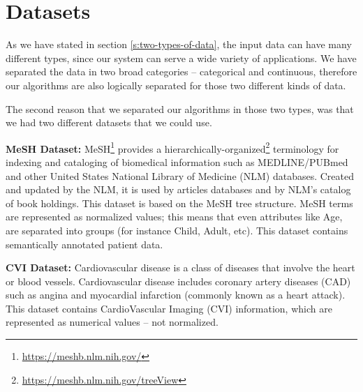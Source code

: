 \section{Datasets}\label{s:datasets}
As we have stated in section \ref{s:two-types-of-data}, the input data can have many different types, since our system can serve a wide variety of applications.
We have separated the data in two broad categories -- categorical and continuous, therefore our algorithms are also logically separated for those two different kinds of data.

The second reason that we separated our algorithms in those two types, was that we had two different datasets that we could use.

\textbf{MeSH Dataset:}
MeSH\footnote{\href{https://meshb.nlm.nih.gov/}{https://meshb.nlm.nih.gov/}} provides a hierarchically-organized\footnote{\href{https://meshb.nlm.nih.gov/treeView}{https://meshb.nlm.nih.gov/treeView}} terminology for indexing and cataloging of biomedical information such as MEDLINE/PUBmed and other United States National Library of Medicine (NLM) databases.
Created and updated by the NLM, it is used by articles databases and by NLM's catalog of book holdings.
This dataset is based on the MeSH tree structure.
MeSH terms are represented as normalized values; this means that even attributes like Age, are separated into groups (for instance Child, Adult, etc).
This dataset contains semantically annotated patient data.

\textbf{CVI Dataset:}
Cardiovascular disease is a class of diseases that involve the heart or blood vessels.
Cardiovascular disease includes coronary artery diseases (CAD) such as angina and myocardial infarction (commonly known as a heart attack).
This dataset contains CardioVascular Imaging (CVI) information, which are represented as numerical values – not normalized.


